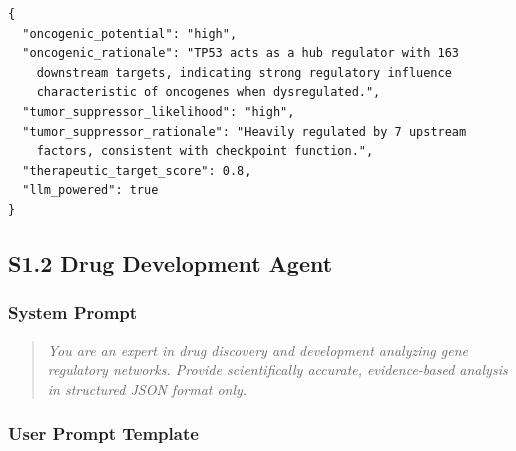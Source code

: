 \documentclass[11pt]{article}
\begin{document}
\begin{lstlisting}
{
  "oncogenic_potential": "high",
  "oncogenic_rationale": "TP53 acts as a hub regulator with 163
    downstream targets, indicating strong regulatory influence
    characteristic of oncogenes when dysregulated.",
  "tumor_suppressor_likelihood": "high",
  "tumor_suppressor_rationale": "Heavily regulated by 7 upstream
    factors, consistent with checkpoint function.",
  "therapeutic_target_score": 0.8,
  "llm_powered": true
}
\end{lstlisting}

\subsection{S1.2 Drug Development Agent}

\subsubsection{System Prompt}

\begin{quote}
\textit{You are an expert in drug discovery and development analyzing gene regulatory networks. Provide scientifically accurate, evidence-based analysis in structured JSON format only.}
\end{quote}

\subsubsection{User Prompt Template}
\end{document}
